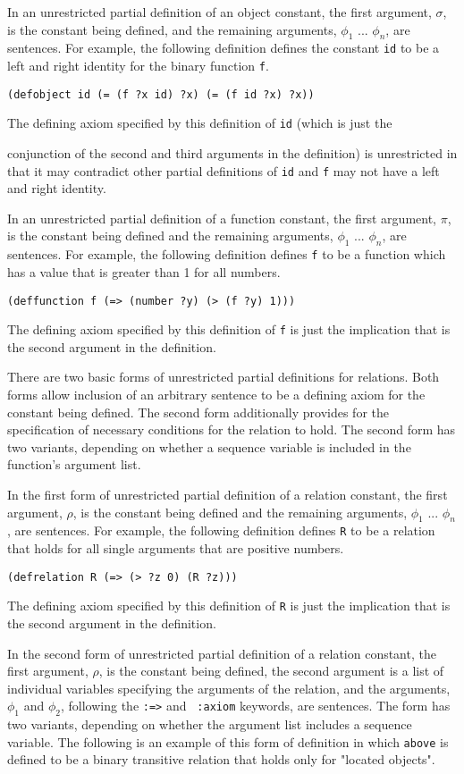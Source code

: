 In an unrestricted partial definition of an object constant, the first
argument, $\sigma$, is the constant being defined, and the remaining
arguments, $\phi_1$ ... $\phi_n$, are sentences.  For example, the following
definition defines the constant {\tt id} to be a left and right identity for
the binary function {\tt f}.

\medskip
{\tt (defobject id (= (f ?x id) ?x) (= (f id ?x) ?x))}
\medskip

The defining axiom specified by this definition of {\tt id} (which is just the

conjunction of the second and third arguments in the definition) is
unrestricted in that it may contradict other partial definitions of {\tt id}
and {\tt f} may not have a left and right identity.

In an unrestricted partial definition of a function constant, the first
argument, $\pi$, is the constant being defined and the remaining arguments,
$\phi_1$ ... $\phi_n$, are sentences.  For example, the following definition
defines {\tt f} to be a function which has a value that is greater than 1 for
all numbers.

\medskip
{\tt (deffunction f (=> (number ?y) (> (f ?y) 1)))}
\medskip

The defining axiom specified by this definition of {\tt f} is just the
implication that is the second argument in the definition.

There are two basic forms of unrestricted partial definitions for relations. 
Both forms allow inclusion of an arbitrary sentence to be a defining axiom for
the constant being defined.  The second form additionally provides for the
specification of necessary conditions for the relation to hold.  The second
form has two variants, depending on whether a sequence variable is included in the function's argument list.

In the first form of unrestricted partial definition of a relation constant,
the first argument, $\rho$, is the constant being defined and the remaining
arguments, $\phi_1$ ... $\phi_n$, are sentences.  For example, the following
definition defines {\tt R} to be a relation that holds for all single
arguments that are positive numbers.

\medskip
{\tt (defrelation R (=> (> ?z 0) (R ?z)))}
\medskip

The defining axiom specified by this definition of {\tt R} is just the
implication that is the second argument in the definition.

In the second form of unrestricted partial definition of a relation constant,
the first argument, $\rho$, is the constant being defined, the second argument
is a list of individual variables specifying the arguments of the relation,
and the arguments, $\phi_1$ and $\phi_2$, following the {\tt :=>} and {\tt
:axiom} keywords, are sentences.  The form has two variants, depending on
whether the argument list includes a sequence variable.  The following is an
example of this form of definition in which {\tt above} is defined to be a
binary transitive relation that holds only for "located objects".

